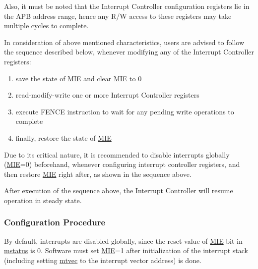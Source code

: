 \documentclass[main\_\_EN.tex]{subfiles}
\begin{document}
Also, it must be noted that the Interrupt Controller configuration registers lie in the APB address range, hence any R/W access to these registers may take multiple cycles to complete.

In consideration of above mentioned characteristics, users are advised to follow the sequence described below, whenever modifying any of the Interrupt Controller registers:
\begin{enumerate}
    \item save the state of \hyperref[fielddesc:MSTATUSMIE]{MIE} and clear \hyperref[fielddesc:MSTATUSMIE]{MIE} to 0
    \item read-modify-write one or more Interrupt Controller registers
    \item execute FENCE instruction to wait for any pending write operations to complete
    \item finally, restore the state of \hyperref[fielddesc:MSTATUSMIE]{MIE}
\end{enumerate}

Due to its critical nature, it is recommended to disable interrupts globally (\hyperref[fielddesc:MSTATUSMIE]{MIE}=0) beforehand, whenever configuring interrupt controller registers, and then restore \hyperref[fielddesc:MSTATUSMIE]{MIE} right after, as shown in the sequence above.

After execution of the sequence above, the Interrupt Controller will resume operation in steady state.

\subsubsection{Configuration Procedure}
\label{sec:riscvcpu-int-config}

By default, interrupts are disabled globally, since the reset value of \hyperref[fielddesc:MSTATUSMIE]{MIE} bit in \hyperref[regdesc:MSTATUS]{mstatus} is 0. Software must set \hyperref[fielddesc:MSTATUSMIE]{MIE}=1 after initialization of the interrupt stack (including setting \hyperref[regdesc:MTVEC]{mtvec} to the interrupt vector address) is done.
\end{document}
